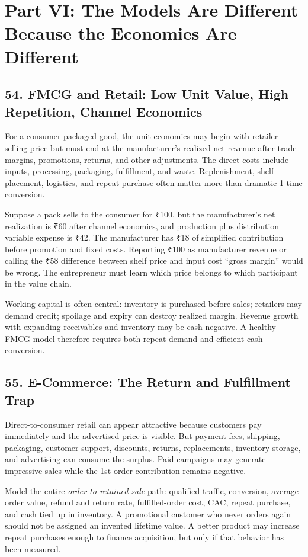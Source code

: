 \section*{Part VI: The Models Are Different Because the Economies Are Different}

\subsection*{54. FMCG and Retail: Low Unit Value, High Repetition, Channel Economics}

For a consumer packaged good, the unit economics may begin with retailer selling price but must end at the manufacturer's realized net revenue after trade margins, promotions, returns, and other adjustments. The direct costs include inputs, processing, packaging, fulfillment, and waste. Replenishment, shelf placement, logistics, and repeat purchase often matter more than dramatic 1-time conversion.

Suppose a pack sells to the consumer for ₹100, but the manufacturer's net realization is ₹60 after channel economics, and production plus distribution variable expense is ₹42. The manufacturer has ₹18 of simplified contribution before promotion and fixed costs. Reporting ₹100 as manufacturer revenue or calling the ₹58 difference between shelf price and input cost ``gross margin'' would be wrong. The entrepreneur must learn which price belongs to which participant in the value chain.

Working capital is often central: inventory is purchased before sales; retailers may demand credit; spoilage and expiry can destroy realized margin. Revenue growth with expanding receivables and inventory may be cash-negative. A healthy FMCG model therefore requires both repeat demand and efficient cash conversion.

\subsection*{55. E-Commerce: The Return and Fulfillment Trap}

Direct-to-consumer retail can appear attractive because customers pay immediately and the advertised price is visible. But payment fees, shipping, packaging, customer support, discounts, returns, replacements, inventory storage, and advertising can consume the surplus. Paid campaigns may generate impressive sales while the 1st-order contribution remains negative.

Model the entire \emph{order-to-retained-sale} path: qualified traffic, conversion, average order value, refund and return rate, fulfilled-order cost, CAC, repeat purchase, and cash tied up in inventory. A promotional customer who never orders again should not be assigned an invented lifetime value. A better product may increase repeat purchases enough to finance acquisition, but only if that behavior has been measured.

